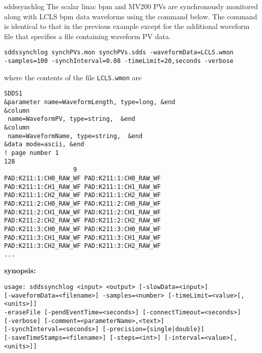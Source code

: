 \begin{sddsprog}{sddssynchlog}
The scalar linac bpm and MV200 PVs are synchronously monitored along
with LCLS bpm data waveforms using the command below.  The command is
identical to that in the previous example except for the additional
waveform file that specifies a file containing waveform PV data.
\begin{verbatim}
sddssynchlog synchPVs.mon synchPVs.sdds -waveformData=LCLS.wmon
-samples=100 -synchInterval=0.08 -timeLimit=20,seconds -verbose
\end{verbatim}
where the contents of the file \verb+LCLS.wmon+ are
\begin{verbatim}
SDDS1
&parameter name=WaveformLength, type=long, &end
&column
 name=WaveformPV, type=string,  &end
&column
 name=WaveformName, type=string,  &end
&data mode=ascii, &end
! page number 1
128
                   9
PAD:K211:1:CH0_RAW_WF PAD:K211:1:CH0_RAW_WF
PAD:K211:1:CH1_RAW_WF PAD:K211:1:CH1_RAW_WF
PAD:K211:1:CH2_RAW_WF PAD:K211:1:CH2_RAW_WF
PAD:K211:2:CH0_RAW_WF PAD:K211:2:CH0_RAW_WF
PAD:K211:2:CH1_RAW_WF PAD:K211:2:CH1_RAW_WF
PAD:K211:2:CH2_RAW_WF PAD:K211:2:CH2_RAW_WF
PAD:K211:3:CH0_RAW_WF PAD:K211:3:CH0_RAW_WF
PAD:K211:3:CH1_RAW_WF PAD:K211:3:CH1_RAW_WF
PAD:K211:3:CH2_RAW_WF PAD:K211:3:CH2_RAW_WF
...
\end{verbatim}
\item \textbf{synopsis:}
\begin{verbatim}
usage: sddssynchlog <input> <output> [-slowData=<input>]
[-waveformData=<filename>] -samples=<number> [-timeLimit=<value>[,<units>]]
-eraseFile [-pendEventTime=<seconds>] [-connectTimeout=<seconds>]
[-verbose] [-comment=<parameterName>,<text>]
[-synchInterval=<seconds>] [-precision={single|double}]
[-saveTimeStamps=<filename>] [-steps=<int>] [-interval=<value>[,<units>]]


\end{verbatim}
\end{sddsprog}
